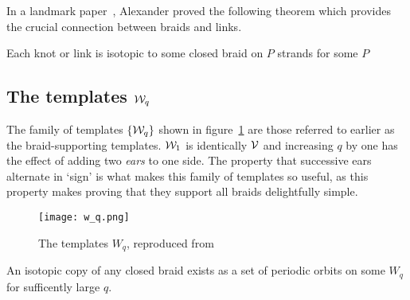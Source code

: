 \documentclass[paper.tex]{subfiles}
\begin{document}
In a landmark paper~\cite{Alexander1923}, Alexander proved the following theorem which provides the crucial connection
between braids and links.


\begin{thm}[Alexander 1923]
  Each knot or link is isotopic to some closed braid on $P$ strands for some $P$
\end{thm}

\subsection{The templates $\mathcal{W}_q$}

The family of templates $\{ \mathcal{W}_q \}$ shown in figure~\ref{fig:w_q} are those referred to earlier as the braid-supporting templates. $\mathcal{W}_1$ is identically $\mathcal{V}$ and increasing $q$ by one has the effect of adding
two \emph{ears} to one side. The property that successive ears alternate in `sign' is what makes this family of templates so useful, as this property makes proving that they support all braids delightfully simple.

\begin{figure}[h]
  \centering
  \texttt{[image: w\_q.png]}
  \caption{The templates $W_q$, reproduced from~\cite{knottyode}}\label{fig:w_q}
\end{figure}


\begin{lemma}[Ghrist 1996]
  An isotopic copy of any closed braid exists as a set of periodic orbits on some $W_q$ for sufficently large $q$.
\end{lemma}
\end{document}
